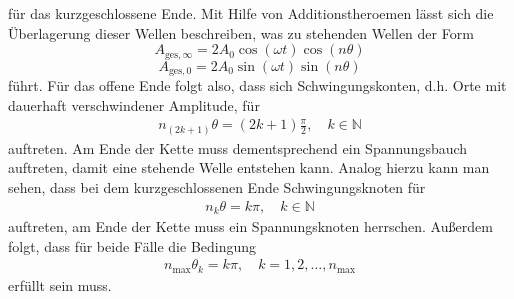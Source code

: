 für das kurzgeschlossene Ende.
Mit Hilfe von Additionstheroemen lässt sich die Überlagerung dieser Wellen beschreiben, was zu stehenden Wellen der Form
\begin{equation}
  \label{eqn:ste_1}
  A_{\text{ges}, \infty} = 2 A_0 \cos{(\omega t)} \cos{(n \theta)}
\end{equation}
\begin{equation}
    \label{eqn:ste_2}
  A_{\text{ges}, 0} = 2 A_0 \sin{(\omega t)} \sin{(n \theta)}
\end{equation}
führt.
Für das offene Ende folgt also, dass sich Schwingungskonten, d.h. Orte mit dauerhaft verschwindener Amplitude, für
\begin{align*}
  n_{(2k+1)} \theta = (2k+1) \frac{\pi}{2}, \quad k \in \mathbb{N}
\end{align*}
auftreten.
Am Ende der Kette muss dementsprechend ein Spannungsbauch auftreten, damit eine stehende Welle entstehen kann.
Analog hierzu kann man sehen, dass bei dem kurzgeschlossenen Ende Schwingungsknoten für
\begin{align*}
  n_{k} \theta = k \pi, \quad k \in \mathbb{N}
\end{align*}
auftreten, am Ende der Kette muss ein Spannungsknoten herrschen.
Außerdem folgt, dass für beide Fälle die Bedingung
\begin{align*}
  n_{\text{max}} \theta_k = k \pi, \quad k = 1, 2, \ldots, n_{\text{max}}
\end{align*}
erfüllt sein muss.
